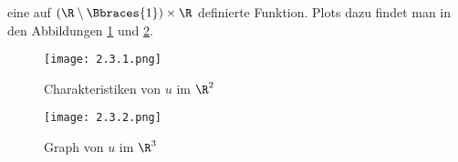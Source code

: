 \begin{solution}
\begin{enumerate}[label = (\roman*)]
	eine auf $(\R \setminus \Bbraces{1}) \times \R$ definierte Funktion.
	Plots dazu findet man in den Abbildungen \ref{fig:lsg_u_char} und \ref{fig:lsg_u_graph}.

	\begin{figure}[h!]
		\centering
		\texttt{[image: 2.3.1.png]}
		\caption{Charakteristiken von $u$ im $\R^2$}
		\label{fig:lsg_u_char}
	\end{figure}

	\begin{figure}[h!]
		\centering
		\texttt{[image: 2.3.2.png]}
		\caption{Graph von $u$ im $\R^3$}
		\label{fig:lsg_u_graph}
	\end{figure}
\end{enumerate}

\end{solution}

